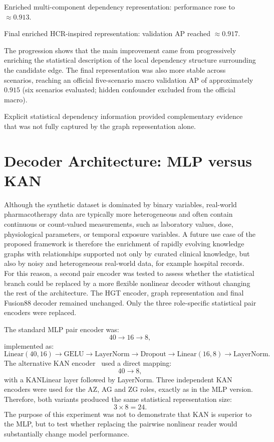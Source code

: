 Enriched multi-component dependency representation: performance rose to $\approx 0.913$.

Final enriched HCR-inspired representation: validation AP reached $\approx 0.917$.

The progression shows that the main improvement came from progressively enriching the statistical description of the local dependency structure surrounding the candidate edge. The final representation was also more stable across scenarios, reaching an official five-scenario macro validation AP of approximately $0.915$ (six scenarios evaluated; hidden confounder excluded from the official macro).

Explicit statistical dependency information provided complementary evidence that was not fully captured by the graph representation alone.

\section{Decoder Architecture: MLP versus KAN}
\label{sec:taskA-mlp-kan}

Although the synthetic dataset is dominated by binary variables, real-world pharmacotherapy data are typically more heterogeneous and often contain continuous or count-valued measurements, such as laboratory values, dose, physiological parameters, or temporal exposure variables. A future use case of the proposed framework is therefore the enrichment of rapidly evolving knowledge graphs with relationships supported not only by curated clinical knowledge, but also by noisy and heterogeneous real-world data, for example hospital records. For this reason, a second pair encoder was tested to assess whether the statistical branch could be replaced by a more flexible nonlinear decoder without changing the rest of the architecture. The HGT encoder, graph representation and final Fusion88 decoder remained unchanged. Only the three role-specific statistical pair encoders were replaced.

The standard MLP pair encoder was:
\begin{equation}
40\to 16\to 8,
\end{equation}
implemented as:
\begin{equation}
\mathrm{Linear}(40,16)\to\mathrm{GELU}\to\mathrm{LayerNorm}\to\mathrm{Dropout}\to\mathrm{Linear}(16,8)\to\mathrm{LayerNorm}.
\end{equation}
The alternative KAN encoder~\cite{liu2024kan} used a direct mapping:
\begin{equation}
40\to 8,
\end{equation}
with a KANLinear layer followed by LayerNorm. Three independent KAN encoders were used for the AZ, AG and ZG roles, exactly as in the MLP version. Therefore, both variants produced the same statistical representation size:
\begin{equation}
3\times 8=24.
\end{equation}
The purpose of this experiment was not to demonstrate that KAN is superior to the MLP, but to test whether replacing the pairwise nonlinear reader would substantially change model performance.

